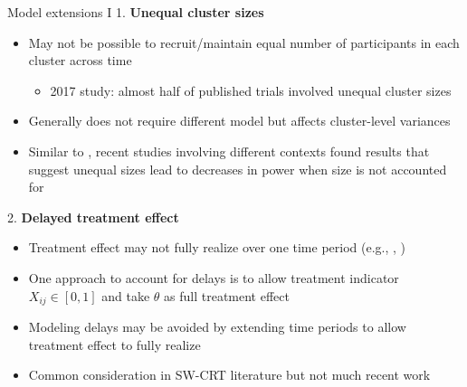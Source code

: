 \documentclass[9pt]{beamer}
\begin{document}
\begin{frame}{Model extensions I}
1. \textbf{Unequal cluster sizes}
\begin{itemize}

\item
May not be possible to recruit/maintain equal number of participants in each cluster across time
\begin{itemize}
\item
2017 study: almost half of published trials involved unequal cluster sizes \citep{Kristunas:2017}
\end{itemize}

\item
Generally does not require different model but affects cluster-level variances

\item
Similar to \citet{Hussey:2007}, recent studies \citep{Martin:2019,Ouyang:2020,Kasza:2021,Tian:2021} involving different contexts found results that suggest unequal sizes lead to decreases in power when size is not accounted for

\end{itemize}
\vspace{2em}

2. \textbf{Delayed treatment effect}
\begin{itemize}

\item
Treatment effect may not fully realize over one time period (e.g., \citep{Hughes:2015}, \citep{Agius:2020})

\item
One approach to account for delays is to allow treatment indicator $X_{ij}\in[0,1]$ and take $\theta$ as full treatment effect

\item
Modeling delays may be avoided by extending time periods to allow treatment effect to fully realize

\item
Common consideration in SW-CRT literature but not much recent work

\end{itemize}
\end{frame}
\end{document}
